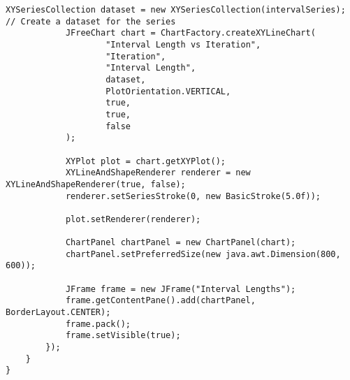 \begin{lstlisting}[style=JavaStyle, caption={Java Code for Task1}]
            XYSeriesCollection dataset = new XYSeriesCollection(intervalSeries); // Create a dataset for the series
            JFreeChart chart = ChartFactory.createXYLineChart(
                    "Interval Length vs Iteration", 
                    "Iteration",                    
                    "Interval Length",              
                    dataset,                         
                    PlotOrientation.VERTICAL,        
                    true,
                    true,   
                    false                        
            );

            XYPlot plot = chart.getXYPlot();
            XYLineAndShapeRenderer renderer = new XYLineAndShapeRenderer(true, false);
            renderer.setSeriesStroke(0, new BasicStroke(5.0f));

            plot.setRenderer(renderer);

            ChartPanel chartPanel = new ChartPanel(chart);
            chartPanel.setPreferredSize(new java.awt.Dimension(800, 600)); 

            JFrame frame = new JFrame("Interval Lengths"); 
            frame.getContentPane().add(chartPanel, BorderLayout.CENTER);
            frame.pack(); 
            frame.setVisible(true); 
        });
    }
}

    \end{lstlisting}
    
